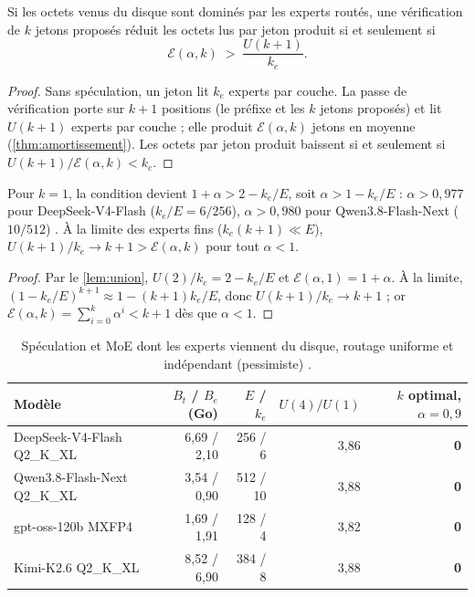 \begin{proposition}\label{prop:spec-moe}
Si les octets venus du disque sont dominés par les experts routés, une vérification de $k$ jetons proposés réduit les octets lus par jeton produit si et seulement si
\begin{equation}\label{eq:spec-moe}
\mathcal E(\alpha, k) \;>\; \frac{U(k+1)}{k_e}.
\end{equation}
\end{proposition}

\begin{proof}
Sans spéculation, un jeton lit $k_e$ experts par couche. La passe de vérification porte sur $k+1$ positions (le préfixe et les $k$ jetons proposés) et lit $U(k+1)$ experts par couche ; elle produit $\mathcal E(\alpha,k)$ jetons en moyenne (\cref{thm:amortissement}). Les octets par jeton produit baissent si et seulement si $U(k+1)/\mathcal E(\alpha,k) < k_e$.
\end{proof}

\begin{corollaire}\label{cor:jamais}
Pour $k = 1$, la condition devient $1 + \alpha > 2 - k_e/E$, soit $\alpha > 1 - k_e/E$ : $\alpha > 0{,}977$ pour DeepSeek-V4-Flash ($k_e/E = 6/256$), $\alpha > 0{,}980$ pour Qwen3.8-Flash-Next ($10/512$) \calc. À la limite des experts fins ($k_e(k+1) \ll E$), $U(k+1)/k_e \to k+1 > \mathcal E(\alpha,k)$ pour tout $\alpha < 1$.
\end{corollaire}

\begin{proof}
Par le \cref{lem:union}, $U(2)/k_e = 2 - k_e/E$ et $\mathcal E(\alpha,1) = 1 + \alpha$. À la limite, $(1 - k_e/E)^{k+1} \approx 1 - (k+1)k_e/E$, donc $U(k+1)/k_e \to k+1$ ; or $\mathcal E(\alpha,k) = \sum_{i=0}^k \alpha^i < k + 1$ dès que $\alpha < 1$.
\end{proof}

\begin{table}[ht]
\centering\small
\caption[Spéculation et MoE lus du disque]{Spéculation et MoE dont les experts viennent du disque, routage uniforme et indépendant (pessimiste) \calc.}
\label{tab:spec-moe}
\begin{tabular}{@{}lrrrr@{}}
\toprule
Modèle & $B_t$ / $B_e$ (Go) & $E$ / $k_e$ & $U(4)/U(1)$ & $k$ optimal, $\alpha = 0{,}9$ \\
\midrule
DeepSeek-V4-Flash Q2\_K\_XL & 6,69 / 2,10 & 256 / 6 & 3,86 & \textbf{0} \\
Qwen3.8-Flash-Next Q2\_K\_XL & 3,54 / 0,90 & 512 / 10 & 3,88 & \textbf{0} \\
gpt-oss-120b MXFP4 & 1,69 / 1,91 & 128 / 4 & 3,82 & \textbf{0} \\
Kimi-K2.6 Q2\_K\_XL & 8,52 / 6,90 & 384 / 8 & 3,88 & \textbf{0} \\
\bottomrule
\end{tabular}
\end{table}

